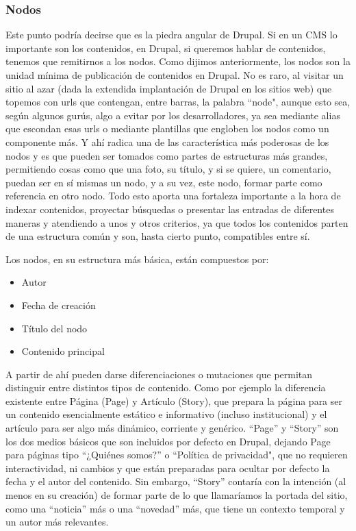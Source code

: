 \subsubsection{Nodos} 

\par Este punto podría decirse que es la piedra angular de Drupal. Si en un CMS lo importante son los contenidos, en Drupal, si queremos hablar de contenidos, tenemos que remitirnos a los nodos. Como dijimos anteriormente, los nodos son la unidad mínima de publicación de contenidos en Drupal. No es raro, al visitar un sitio al azar (dada la extendida implantación de Drupal en los sitios web) que topemos con urls que contengan, entre barras, la palabra ``node", aunque esto sea, según algunos gurús, algo a evitar por los desarrolladores, ya sea mediante alias que escondan esas urls o mediante plantillas que engloben los nodos como un componente más.
Y ahí radica una de las característica más poderosas de los nodos y es que pueden ser tomados como partes de estructuras más grandes, permitiendo cosas como que una foto, su título, y si se quiere, un comentario, puedan ser en sí mismas un nodo, y a su vez, este nodo, formar parte como referencia en otro nodo. 
Todo esto aporta una fortaleza importante a la hora de indexar contenidos, proyectar búsquedas o presentar las entradas de diferentes maneras y atendiendo a unos y otros criterios, ya que todos los contenidos parten de una estructura común y son, hasta cierto punto, compatibles entre sí.

\par Los nodos, en su estructura más básica, están compuestos por:
\begin{itemize}
\item Autor
\item Fecha de creación
\item Título del nodo
\item Contenido principal
\end{itemize}

\par A partir de ahí pueden darse diferenciaciones o mutaciones que permitan distinguir entre distintos tipos de contenido. Como por ejemplo la diferencia existente entre Página (Page) y Artículo (Story), que prepara la página para ser un contenido esencialmente estático e informativo (incluso institucional) y el artículo para ser algo más dinámico, corriente y genérico. ``Page'' y ``Story'' son los dos medios básicos que son incluidos por defecto en Drupal, dejando Page para páginas tipo ``¿Quiénes somos?'' o ``Política de privacidad", que no requieren interactividad, ni cambios y que están preparadas para ocultar por defecto la fecha y el autor del contenido. Sin embargo, ``Story'' contaría con la intención (al menos en su creación) de formar parte de lo que llamaríamos la portada del sitio, como una ``noticia'' más o una ``novedad'' más, que tiene un contexto temporal y un autor más relevantes.

